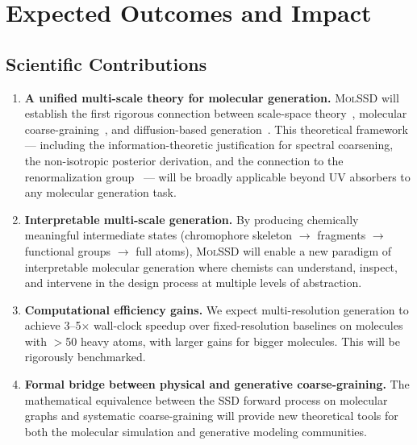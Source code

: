 \documentclass[11pt,a4paper]{article}
\newcommand{\molssd}{\textsc{MolSSD}}
\begin{document}
\section{Expected Outcomes and Impact}

\subsection{Scientific Contributions}

\begin{enumerate}[leftmargin=*]
  \item \textbf{A unified multi-scale theory for molecular generation.}
    \molssd{} will establish the first rigorous connection between scale-space
    theory~\citep{lindeberg1994scalespace}, molecular
    coarse-graining~\citep{noid2008cg}, and diffusion-based
    generation~\citep{ho2020ddpm}. This theoretical framework --- including the
    information-theoretic justification for spectral coarsening, the non-isotropic
    posterior derivation, and the connection to the renormalization
    group~\citep{wilson1983renormalization} --- will be broadly applicable beyond
    UV absorbers to any molecular generation task.

  \item \textbf{Interpretable multi-scale generation.}
    By producing chemically meaningful intermediate states (chromophore skeleton
    $\to$ fragments $\to$ functional groups $\to$ full atoms), \molssd{} will enable
    a new paradigm of interpretable molecular generation where chemists can understand,
    inspect, and intervene in the design process at multiple levels of abstraction.

  \item \textbf{Computational efficiency gains.}
    We expect multi-resolution generation to achieve 3--5$\times$ wall-clock speedup
    over fixed-resolution baselines on molecules with $>$50 heavy atoms, with larger
    gains for bigger molecules. This will be rigorously benchmarked.

  \item \textbf{Formal bridge between physical and generative coarse-graining.}
    The mathematical equivalence between the SSD forward process on molecular graphs
    and systematic coarse-graining will provide new theoretical tools for both the
    molecular simulation and generative modeling communities.
\end{enumerate}
\end{document}
